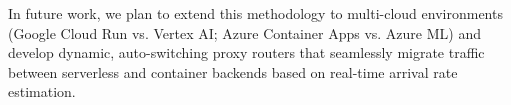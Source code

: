 \documentclass[conference]{IEEEtran}
\begin{document}
In future work, we plan to extend this methodology to multi-cloud environments (Google Cloud Run vs. Vertex AI; Azure Container Apps vs. Azure ML) and develop dynamic, auto-switching proxy routers that seamlessly migrate traffic between serverless and container backends based on real-time arrival rate estimation.



\end{document}
